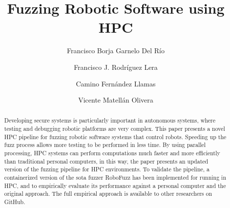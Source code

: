 \documentclass{svproc}
\begin{document}
\mainmatter              %
%
\title{Fuzzing Robotic Software using HPC}
%






\author{
  Francisco Borja Garnelo Del Río  \and
  Francisco J. Rodríguez Lera  \and  
  Camino Fernández Llamas  \and
  Vicente Matellán Olivera 
  }



%
%





\maketitle              %

\begin{abstract} 
Developing secure systems is particularly important in autonomous systems, where testing and debugging robotic platforms are very complex. This paper presents a novel HPC pipeline for fuzzing robotic software systems that control robots. 
Speeding up the fuzz process allows more testing to be performed in less time. By using parallel processing, HPC systems can perform computations much faster and more efficiently than traditional personal computers, in this way, the paper presents an updated version of the fuzzing pipeline for HPC environments. 
To validate the pipeline, a containerized version of the sota fuzzer RoboFuzz has been implemented for running in HPC, and to empirically evaluate its performance against a personal computer and the original approach. The full empirical approach is available to other researchers on GitHub.


\end{abstract}
%
\end{document}
